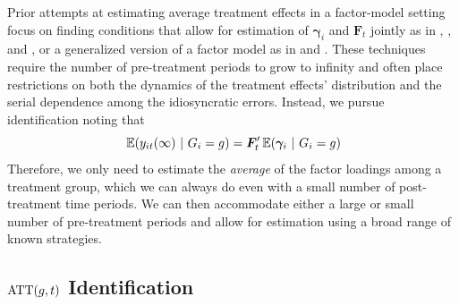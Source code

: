 \documentclass[12pt]{article}
\begin{document}
Prior attempts at estimating average treatment effects in a factor-model setting focus on finding conditions that allow for estimation of $\bm \gamma_i$ and $\bm{F}_t$ jointly as in \citet{Gobillon_Magnac_2016}, \citet{xu2017generalized}, and \citet{Bai_Ng_2021}, or a generalized version of a factor model as in \citet{Feng_2020} and \citet{arkhangelsky2021synthetic}. These techniques require the number of pre-treatment periods to grow to infinity and often place restrictions on both the dynamics of the treatment effects' distribution and the serial dependence among the idiosyncratic errors. Instead, we pursue identification noting that 
\begin{equation}\label{eq:untreated_cond_expectation}
\expec{y_{it}(\infty)}{G_i = g} = \bm{F}_t' \expec{\bm \gamma_i}{G_i = g}
\end{equation}
Therefore, we only need to estimate the \emph{average} of the factor loadings among a treatment group, which we can always do even with a small number of post-treatment time periods. We can then accommodate either a large or small number of pre-treatment periods and allow for estimation using a broad range of known strategies.

\subsection{\texorpdfstring{$\text{ATT}(g,t)$}{ATT(g,t)} Identification}\label{sec:ATT_identification}
\end{document}
